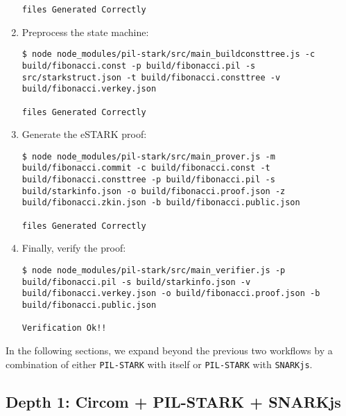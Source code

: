 \begin{enumerate}
\begin{lstlisting}[style=termt]
files Generated Correctly
\end{lstlisting}

\item Preprocess the state machine:
\begin{lstlisting}[style=termt]
$ node node_modules/pil-stark/src/main_buildconsttree.js -c build/fibonacci.const -p build/fibonacci.pil -s src/starkstruct.json -t build/fibonacci.consttree -v build/fibonacci.verkey.json

files Generated Correctly
\end{lstlisting}

\item Generate the eSTARK proof:
\begin{lstlisting}[style=termt]
$ node node_modules/pil-stark/src/main_prover.js -m build/fibonacci.commit -c build/fibonacci.const -t build/fibonacci.consttree -p build/fibonacci.pil -s build/starkinfo.json -o build/fibonacci.proof.json -z build/fibonacci.zkin.json -b build/fibonacci.public.json

files Generated Correctly
\end{lstlisting}

\item Finally, verify the proof:
\begin{lstlisting}[style=termt]
$ node node_modules/pil-stark/src/main_verifier.js -p build/fibonacci.pil -s build/starkinfo.json -v build/fibonacci.verkey.json -o build/fibonacci.proof.json -b build/fibonacci.public.json

Verification Ok!!
\end{lstlisting}
\end{enumerate}

In the following sections, we expand beyond the previous two workflows by a combination of either \texttt{PIL-STARK} with itself or \texttt{PIL-STARK} with \texttt{SNARKjs}. 

\subsection{Depth 1: Circom + PIL-STARK + SNARKjs}


